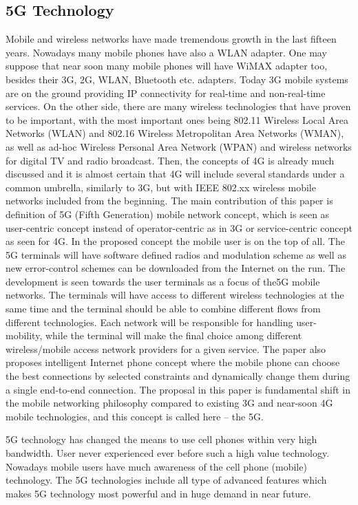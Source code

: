 \documentclass[conference]{IEEEtran}
\begin{document}
\subsection{5G Technology}
Mobile and wireless networks have made tremendous growth in the last fifteen years. Nowadays many mobile phones have also a WLAN adapter. One may suppose that near soon many mobile phones will have WiMAX adapter too, besides their 3G, 2G, WLAN, Bluetooth etc. adapters. Today 3G mobile systems are on the ground providing IP connectivity for real-time and non-real-time services. On the other side, there are many wireless technologies that have proven to be important, with the most important ones being 802.11 Wireless Local Area Networks (WLAN) and 802.16 Wireless Metropolitan Area Networks (WMAN), as well as ad-hoc Wireless Personal Area Network (WPAN) and wireless networks for digital TV and radio broadcast. Then, the concepts of 4G is already much discussed and it is almost certain that 4G will include several standards under a common umbrella, similarly to 3G, but with IEEE 802.xx wireless mobile networks included from the beginning. The main contribution of this paper is definition of 5G (Fifth Generation) mobile network concept, which is seen as user-centric concept instead of operator-centric as in 3G or service-centric concept as seen for 4G. In the proposed concept the mobile user is on the top of all. The 5G terminals will have software defined radios and modulation scheme as well as new error-control schemes can be downloaded from the Internet on the run. The development is seen towards the user terminals as a focus of the5G mobile networks. The terminals will have access to different wireless technologies at the same time and the terminal should be able to combine different flows from different technologies. Each network will be responsible for handling user-mobility, while the terminal will make the final choice among different wireless/mobile access network providers for a given service. The paper also proposes intelligent Internet phone concept where the mobile phone can choose the best connections by selected constraints and dynamically change them during a single end-to-end connection. The proposal in this paper is fundamental shift in the mobile networking philosophy compared to existing 3G and near-soon 4G mobile technologies, and this concept is called here – the 5G.
\par
5G technology has changed the means to use cell phones within very high bandwidth. User never experienced ever before such a high value technology. Nowadays mobile users have much awareness of the cell phone (mobile) technology. The 5G technologies include all type of advanced features which makes 5G technology most powerful and in huge demand in near future.
\end{document}
